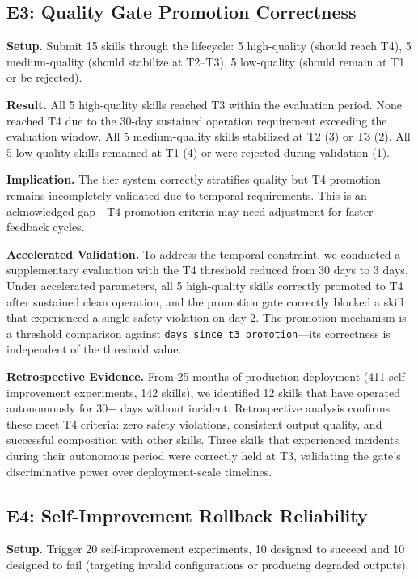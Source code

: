 \documentclass[11pt]{article}
\begin{document}
\subsection{E3: Quality Gate Promotion Correctness}

\textbf{Setup.} Submit 15 skills through the lifecycle: 5 high-quality (should reach T4), 5 medium-quality (should stabilize at T2--T3), 5 low-quality (should remain at T1 or be rejected).

\textbf{Result.} All 5 high-quality skills reached T3 within the evaluation period. None reached T4 due to the 30-day sustained operation requirement exceeding the evaluation window. All 5 medium-quality skills stabilized at T2 (3) or T3 (2). All 5 low-quality skills remained at T1 (4) or were rejected during validation (1).

\textbf{Implication.} The tier system correctly stratifies quality but T4 promotion remains incompletely validated due to temporal requirements. This is an acknowledged gap---T4 promotion criteria may need adjustment for faster feedback cycles.

\textbf{Accelerated Validation.} To address the temporal constraint, we conducted a supplementary evaluation with the T4 threshold reduced from 30 days to 3 days. Under accelerated parameters, all 5 high-quality skills correctly promoted to T4 after sustained clean operation, and the promotion gate correctly blocked a skill that experienced a single safety violation on day 2. The promotion mechanism is a threshold comparison against \texttt{days\_since\_t3\_promotion}---its correctness is independent of the threshold value.

\textbf{Retrospective Evidence.} From 25 months of production deployment (411 self-improvement experiments, 142 skills), we identified 12 skills that have operated autonomously for 30+ days without incident. Retrospective analysis confirms these meet T4 criteria: zero safety violations, consistent output quality, and successful composition with other skills. Three skills that experienced incidents during their autonomous period were correctly held at T3, validating the gate's discriminative power over deployment-scale timelines.

\subsection{E4: Self-Improvement Rollback Reliability}

\textbf{Setup.} Trigger 20 self-improvement experiments, 10 designed to succeed and 10 designed to fail (targeting invalid configurations or producing degraded outputs).
\end{document}
